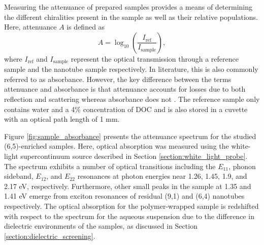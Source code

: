Measuring the attenuance of prepared samples provides a means of determining the different chiralities present in the sample as well as their relative populations. Here, attenuance $A$ is defined as
\begin{equation}
A = \log_{10}\left(\dfrac{I_{\mathrm{ref}}}{I_{\mathrm{sample}}}\right),
\end{equation}
where $I_{\mathrm{ref}}$ and $I_{\mathrm{sample}}$ represent the optical transmission through a reference sample and the nanotube sample respectively. In literature, this is also commonly referred to as absorbance. However, the key difference between the terms attenuance and absorbance is that attenuance accounts for losses due to both reflection and scattering whereas absorbance does not \cite{dixon1992absorbance}. The reference sample only contains water and a 4\% concentration of DOC and is also stored in a cuvette with an optical path length of 1 mm.

Figure \ref{fig:sample_absorbance} presents the attenuance spectrum for the studied (6,5)-enriched samples. Here, optical absorption was measured using the white-light supercontinuum source described in Section \ref{section:white_light_probe}. The spectrum exhibits a number of optical transitions including the $E_{11}$, phonon sideband, $E_{12}$, and $E_{22}$ resonances at photon energies near 1.26, 1.45, 1.9, and 2.17 eV, respectively. Furthermore, other small peaks in the sample at 1.35 and 1.41 eV emerge from exciton resonances of residual (9,1) and (6,4) nanotubes respectively. The optical absorption for the polymer-wrapped sample is redshifted with respect to the spectrum for the aqueous suspension due to the difference in dielectric environments of the samples, as discussed in Section \ref{section:dielectric_screening}.

